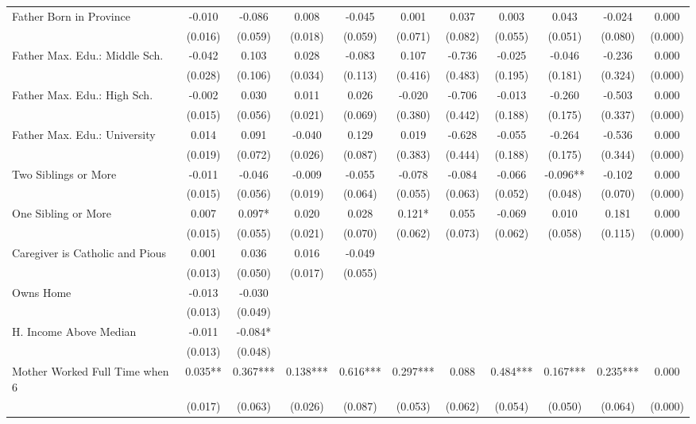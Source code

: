 \begin{tabular}{lcccccccccc}
Father Born in Province & -0.010 & -0.086 & 0.008 & -0.045 & 0.001 & 0.037 & 0.003 & 0.043 & -0.024 & 0.000 \\
 & (0.016) & (0.059) & (0.018) & (0.059) & (0.071) & (0.082) & (0.055) & (0.051) & (0.080) & (0.000) \\
Father Max. Edu.: Middle Sch. & -0.042 & 0.103 & 0.028 & -0.083 & 0.107 & -0.736 & -0.025 & -0.046 & -0.236 & 0.000 \\
 & (0.028) & (0.106) & (0.034) & (0.113) & (0.416) & (0.483) & (0.195) & (0.181) & (0.324) & (0.000) \\
Father Max. Edu.: High Sch. & -0.002 & 0.030 & 0.011 & 0.026 & -0.020 & -0.706 & -0.013 & -0.260 & -0.503 & 0.000 \\
 & (0.015) & (0.056) & (0.021) & (0.069) & (0.380) & (0.442) & (0.188) & (0.175) & (0.337) & (0.000) \\
Father Max. Edu.: University & 0.014 & 0.091 & -0.040 & 0.129 & 0.019 & -0.628 & -0.055 & -0.264 & -0.536 & 0.000 \\
 & (0.019) & (0.072) & (0.026) & (0.087) & (0.383) & (0.444) & (0.188) & (0.175) & (0.344) & (0.000) \\
Two Siblings or More & -0.011 & -0.046 & -0.009 & -0.055 & -0.078 & -0.084 & -0.066 & -0.096** & -0.102 & 0.000 \\
 & (0.015) & (0.056) & (0.019) & (0.064) & (0.055) & (0.063) & (0.052) & (0.048) & (0.070) & (0.000) \\
One Sibling or More & 0.007 & 0.097* & 0.020 & 0.028 & 0.121* & 0.055 & -0.069 & 0.010 & 0.181 & 0.000 \\
 & (0.015) & (0.055) & (0.021) & (0.070) & (0.062) & (0.073) & (0.062) & (0.058) & (0.115) & (0.000) \\
Caregiver is Catholic and Pious & 0.001 & 0.036 & 0.016 & -0.049 &  &  &  &  &  &  \\
 & (0.013) & (0.050) & (0.017) & (0.055) &  &  &  &  &  &  \\
Owns Home & -0.013 & -0.030 &  &  &  &  &  &  &  &  \\
 & (0.013) & (0.049) &  &  &  &  &  &  &  &  \\
H. Income Above Median & -0.011 & -0.084* &  &  &  &  &  &  &  &  \\
 & (0.013) & (0.048) &  &  &  &  &  &  &  &  \\
Mother Worked Full Time when 6 & 0.035** & 0.367*** & 0.138*** & 0.616*** & 0.297*** & 0.088 & 0.484*** & 0.167*** & 0.235*** & 0.000 \\
 & (0.017) & (0.063) & (0.026) & (0.087) & (0.053) & (0.062) & (0.054) & (0.050) & (0.064) & (0.000) \\

\end{tabular}
